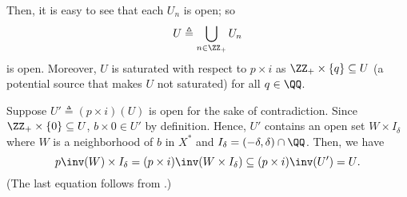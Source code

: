 \documentclass[MAS331_Note.tex]{subfiles}
\begin{document}
{\begin{center}
    \end{center}
    Then, it is easy to see that each $U_n$ is open; so
    \[
        U \triangleq \bigcup_{n \in \ZZ_+} U_n
    \]
    is open.
    Moreover, $U$ is saturated with respect to $p \times i$ as $\ZZ_+ \times \{q\} \subseteq U$
    (a potential source that makes $U$ not saturated) for all $q \in \QQ$.

    Suppose $U' \triangleq (p \times i)(U)$ is open for the sake of contradiction.
    Since $\ZZ_+ \times \{0\} \subseteq U$, $b \times 0 \in U'$ by definition.
    Hence, $U'$ contains an open set $W \times I_\delta$
    where $W$ is a neighborhood of $b$ in $X^\ast$
    and $I_\delta = (-\delta, \delta) \cap \QQ$.
    Then, we have
    \[
        p\inv(W) \times I_{\delta} = (p \times i)\inv(W \times I_\delta)
        \subseteq (p \times i)\inv(U') = U\text{.}
    \]
    (The last equation follows from .)

}
\end{document}
